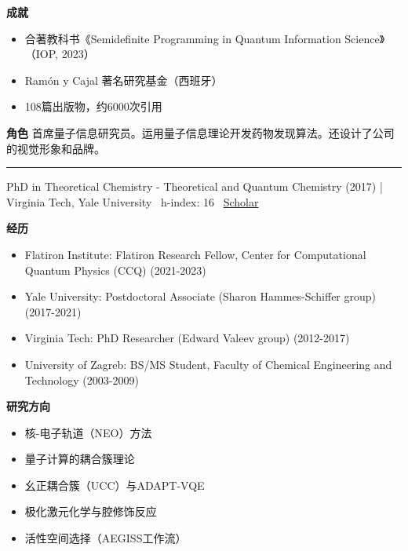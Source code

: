\par{\footnotesize\color{mainred}\textbf{成就}}
\begin{itemize}[leftmargin=1.2em,itemsep=0pt,topsep=0pt]
\item {\footnotesize 合著教科书《Semidefinite Programming in Quantum Information Science》（IOP, 2023）}
\item {\footnotesize Ramón y Cajal 著名研究基金（西班牙）}
\item {\footnotesize 108篇出版物，约6000次引用}
\end{itemize}
\par{\footnotesize\color{mainred}\textbf{角色}} {\footnotesize 首席量子信息研究员。运用量子信息理论开发药物发现算法。还设计了公司的视觉形象和品牌。}
\vspace{2pt}\hrule\vspace{2pt}
\vspace{4pt}
\par{\footnotesize\color{graytext}PhD in Theoretical Chemistry - Theoretical and Quantum Chemistry (2017) | Virginia Tech, Yale University \textbar\  h-index: 16 \textbar\  \href{https://scholar.google.com/citations?user=q2lveLEAAAAJ}{Scholar}}
\par{\footnotesize\color{mainred}\textbf{经历}}
\begin{itemize}[leftmargin=1.2em,itemsep=0pt,topsep=0pt]
\item {\footnotesize Flatiron Institute: Flatiron Research Fellow, Center for Computational Quantum Physics (CCQ) (2021-2023)}
\item {\footnotesize Yale University: Postdoctoral Associate (Sharon Hammes-Schiffer group) (2017-2021)}
\item {\footnotesize Virginia Tech: PhD Researcher (Edward Valeev group) (2012-2017)}
\item {\footnotesize University of Zagreb: BS/MS Student, Faculty of Chemical Engineering and Technology (2003-2009)}
\end{itemize}
\par{\footnotesize\color{mainred}\textbf{研究方向}}
\begin{itemize}[leftmargin=1.2em,itemsep=0pt,topsep=0pt]
\item {\footnotesize 核-电子轨道（NEO）方法}
\item {\footnotesize 量子计算的耦合簇理论}
\item {\footnotesize 幺正耦合簇（UCC）与ADAPT-VQE}
\item {\footnotesize 极化激元化学与腔修饰反应}
\item {\footnotesize 活性空间选择（AEGISS工作流）}
\end{itemize}
